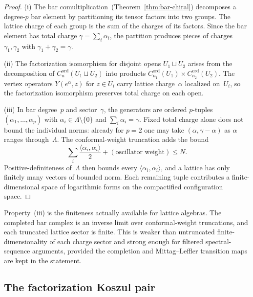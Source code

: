 \begin{proof}
(i) The bar comultiplication~(Theorem~\ref{thm:bar-chiral})
decomposes a degree-$p$ bar element by partitioning its tensor
factors into two groups. The lattice charge of each group is the
sum of the charges of its factors. Since the bar element has total
charge $\gamma = \sum_i \alpha_i$, the partition produces pieces of
charges $\gamma_1, \gamma_2$ with $\gamma_1 + \gamma_2 = \gamma$.

(ii) The factorization isomorphism for disjoint opens
$U_1 \sqcup U_2$ arises from the decomposition of
$C^{\mathrm{ord}}_n(U_1 \sqcup U_2)$ into products
$C^{\mathrm{ord}}_{n_1}(U_1) \times C^{\mathrm{ord}}_{n_2}(U_2)$.
The vertex operators $Y(e^\alpha, z)$ for $z \in U_i$ carry lattice
charge~$\alpha$ localized on~$U_i$, so the factorization
isomorphism preserves total charge on each open.

(iii) In bar degree~$p$ and sector~$\gamma$, the generators are
ordered $p$-tuples $(\alpha_1, \ldots, \alpha_p)$ with
$\alpha_i \in \Lambda \setminus \{0\}$ and
$\sum_i \alpha_i = \gamma$. Fixed total charge alone does not bound
the individual norms: already for $p=2$ one may take
$(\alpha, \gamma-\alpha)$ as $\alpha$ ranges through~$\Lambda$.
The conformal-weight truncation adds the bound
\[
 \sum_i \frac{\langle\alpha_i,\alpha_i\rangle}{2}
 +(\text{oscillator weight}) \leq N.
\]
Positive-definiteness of~$\Lambda$ then bounds every
$\langle\alpha_i,\alpha_i\rangle$, and a lattice has only finitely
many vectors of bounded norm. Each remaining tuple contributes a
finite-dimensional space of logarithmic forms on the compactified
configuration space.
\end{proof}

\begin{remark}
\label{rem:lattice:sectorwise-finiteness}
Property~(iii) is the finiteness actually available for lattice
algebras. The completed bar complex is an inverse limit over
conformal-weight truncations, and each truncated lattice sector is
finite. This is weaker than untruncated finite-dimensionality of
each charge sector and strong enough for filtered spectral-sequence
arguments, provided the completion and Mittag--Leffler transition maps
are kept in the statement.
\end{remark}

\subsection{The factorization Koszul pair}

